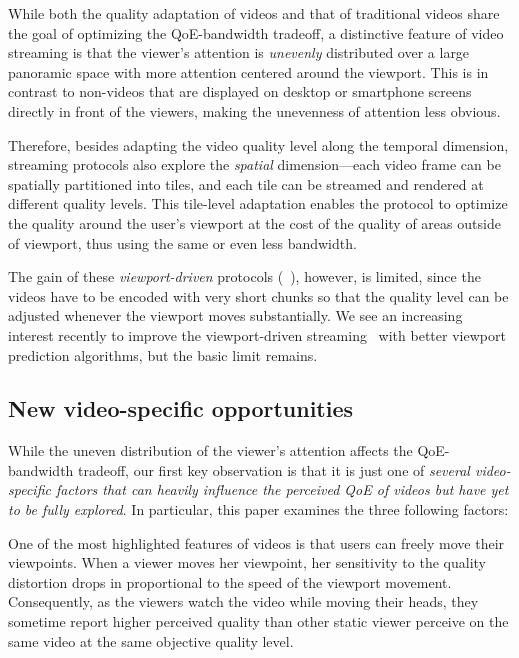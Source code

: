 While both the quality adaptation of \vr videos and that of traditional videos share the goal of optimizing the QoE-bandwidth tradeoff, a distinctive feature of \vr video streaming is that the viewer's attention is {\em unevenly} distributed over a large panoramic space with more attention centered around the viewport. 
This is in contrast to non-\vr videos that are displayed on desktop or smartphone screens directly in front of the viewers, making the unevenness of attention less obvious.

Therefore, besides adapting the video quality level along the temporal dimension, \vr streaming protocols also explore the {\em spatial} dimension---each video frame can be spatially partitioned into tiles, and each tile can be streamed and rendered at different quality levels.
This tile-level adaptation enables the protocol to optimize the quality around the user's viewport at the cost of the quality of areas outside of viewport, thus using the same or even less bandwidth. 

The gain of these {\em viewport-driven} protocols (\eg~\cite{??,??,??}), however, is limited, since the videos have to be encoded with very short chunks so that the quality level can be adjusted whenever the viewport moves substantially. 
We see an increasing interest recently to improve the viewport-driven streaming~\cite{??,??,??} with better viewport prediction algorithms, but the basic limit remains.


\subsection{New \vr video-specific opportunities}

While the uneven distribution of the viewer's attention affects the QoE-bandwidth tradeoff, our first key observation is that it is just one of {\em several \vr video-specific factors that can heavily influence the perceived QoE of \vr videos but have yet to be fully explored}. 
In particular, this paper examines the three following factors:

One of the most highlighted features of \vr videos is that users can freely move their viewpoints. 
When a viewer moves her viewpoint, her sensitivity to the quality distortion drops in proportional to the speed of the viewport movement.
Consequently, as the viewers watch the video while moving their heads, they sometime report higher perceived quality than other static viewer perceive on the same video at the same objective quality level.



